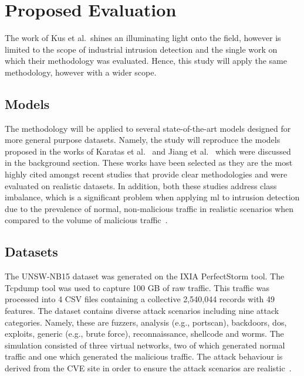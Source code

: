 \chapter{Proposed Evaluation}%
\label{chp:evaluation}

The work of Kus et al.\ shines an illuminating light onto the field, however is
limited to the scope of industrial intrusion detection and the single work on
which their methodology was evaluated. Hence, this study will apply the same
methodology, however with a wider scope.

\section{Models}%
\label{sec:models}

The methodology will be applied to several state-of-the-art models designed for
more general purpose datasets. Namely, the study will reproduce the models
proposed in the works of Karatas et al.~\cite{Karatas} and Jiang et
al.~\cite{Jiang} which were discussed in the background section. These works
have been selected as they are the most highly cited amongst recent studies
that provide clear methodologies and were evaluated on realistic datasets. In
addition, both these studies address class imbalance, which is a significant
problem when applying \gls{ml} to intrusion detection due to the prevalence of
normal, non-malicious traffic in realistic scenarios when compared to the
volume of malicious traffic~\cite{imbalance}.

\section{Datasets}%
\label{sec:datasets}

The UNSW-NB15 dataset was generated on the IXIA PerfectStorm tool. The Tcpdump
tool was used to capture 100 GB of raw traffic. This traffic was processed into
4 CSV files containing a collective 2,540,044 records with 49 features. The
dataset contains diverse attack scenarios including nine attack categories.
Namely, these are fuzzers, analysis (e.g., portscan), backdoors, \gls{dos},
exploits, generic (e.g., brute force), reconnaissance, shellcode and worms. The
simulation consisted of three virtual networks, two of which generated normal
traffic and one which generated the malicious traffic. The attack behaviour is
derived from the CVE site in order to ensure the attack scenarios are
realistic~\cite{unsw15}.

